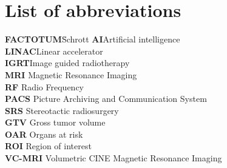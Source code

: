 \documentclass[12pt,a4paper,twoside]{report}
\begin{document}
\setcounter{biburllcpenalty}{9000}
\setcounter{biburlucpenalty}{9000}
\setcounter{biburlnumpenalty}{9000}
\printbibliography



\newpage
\appendix

\chapter*{List of abbreviations}

\begin{tabbing}
	\textbf{FACTOTUM}\hspace{1cm}\=Schrott\kill
    \textbf{AI}\>Artificial intelligence  \\
	\textbf{LINAC}\>Linear accelerator \\
    \textbf{IGRT}\>Image guided radiotherapy  \\
	\textbf{MRI} \> Magnetic Resonance Imaging\\
    \textbf{RF} \> Radio Frequency\\
    \textbf{PACS} \> Picture Archiving and Communication System\\
    \textbf{SRS} \> Stereotactic radiosurgery\\
    \textbf{GTV} \> Gross tumor volume\\
    \textbf{OAR} \> Organs at risk\\
    \textbf{ROI} \> Region of interest\\
    \textbf{VC-MRI} \> Volumetric CINE Magnetic Resonance Imaging\\
\end{tabbing}

\newpage


\renewcommand{\baselinestretch}{1.3}
\small\normalsize

\listoffigures
\end{document}
